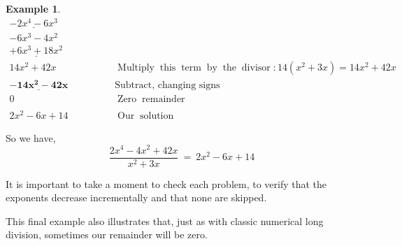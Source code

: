 \documentclass[12pt]{book}
\theoremstyle{definition}
\newtheorem{example}{Example}
\newcommand{\tmmathbf}[1]{\ensuremath{\boldsymbol{#1}}}
\newcommand{\tmop}[1]{\ensuremath{\operatorname{#1}}}
\begin{document}
\begin{example}
\begin{eqnarray*}
    \underline{- 2 x^4 - 6 x^3 }~~~~~~~~~~~~~~~~~~~ &  & \\
    - 6 x^3 - 4 x^2~~~~~~~~~~~ &  & \\
    \underline{+ 6 x^3 + 18 x^2}~~~~~~~~~~  &  & \\
    14 x^2 + 42x~ &  & \tmop{Multiply} \tmop{this} \tmop{term} \tmop{by} \tmop{the}
    \tmop{divisor} : 14 (x^2 + 3x) = 14 x^2 + 42x\\
    \tmmathbf{\underline{- 14 x^2 - 42x}} &  & \tmop{Subtract,~changing~signs}\\
    0~~~ &  & \tmop{Zero} \tmop{remainder}\\
    &  & \\
    2 x^2 - 6 x + 14 &  & \tmop{Our} \tmop{solution}
  \end{eqnarray*}
\end{example}
So we have,
$$\frac{2 x^4 - 4 x^2 + 42x}{x^2+3x}~=~2 x^2 - 6 x + 14$$ 

It is important to take a moment to check each problem, to verify that the
exponents decrease incrementally and that none are skipped. 

This final example also illustrates that, just as with classic numerical long
division, sometimes our remainder will be zero.
\end{document}

